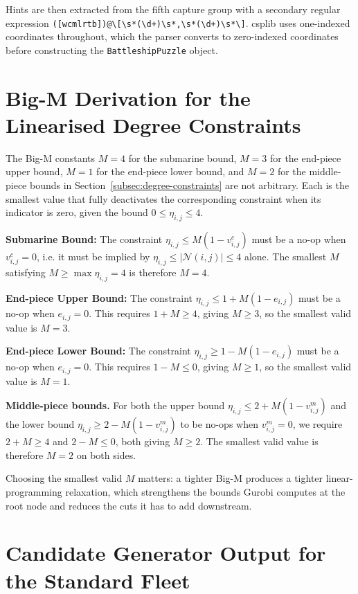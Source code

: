 Hints are then extracted from the fifth capture group with a secondary regular expression \verb|([wcmlrtb])@\[\s*(\d+)\s*,\s*(\d+)\s*\]|. \gls{csplib} uses one-indexed coordinates throughout, which the parser converts to zero-indexed coordinates before constructing the \verb|BattleshipPuzzle| object.

\section{Big-M Derivation for the Linearised Degree Constraints}\label{app:bigm}

The Big-M constants $M = 4$ for the submarine bound, $M = 3$ for the end-piece upper bound, $M = 1$ for the end-piece lower bound, and $M = 2$ for the middle-piece bounds in Section~\ref{subsec:degree-constraints} are not arbitrary. Each is the smallest value that fully deactivates the corresponding constraint when its indicator is zero, given the bound $0 \leq \eta_{i,j} \leq 4$.

\textbf{Submarine Bound:}
The constraint $\eta_{i,j} \leq M (1 - v_{i,j}^c)$ must be a no-op when $v_{i,j}^c = 0$, i.e. it must be implied by $\eta_{i,j} \leq |\mathcal{N}(i, j)| \leq 4$ alone. The smallest $M$ satisfying $M \geq \max \eta_{i,j} = 4$ is therefore $M = 4$.

\textbf{End-piece Upper Bound:}
The constraint $\eta_{i,j} \leq 1 + M(1 - e_{i,j})$ must be a no-op when $e_{i,j} = 0$. This requires $1 + M \geq 4$, giving $M \geq 3$, so the smallest valid value is $M = 3$.

\textbf{End-piece Lower Bound:}
The constraint $\eta_{i,j} \geq 1 - M(1 - e_{i,j})$ must be a no-op when $e_{i,j} = 0$. This requires $1 - M \leq 0$, giving $M \geq 1$, so the smallest valid value is $M = 1$.

\textbf{Middle-piece bounds.}
For both the upper bound $\eta_{i,j} \leq 2 + M(1 - v_{i,j}^m)$ and the lower bound $\eta_{i,j} \geq 2 - M(1 - v_{i,j}^m)$ to be no-ops when $v_{i,j}^m = 0$, we require $2 + M \geq 4$ and $2 - M \leq 0$, both giving $M \geq 2$. The smallest valid value is therefore $M = 2$ on both sides.

Choosing the smallest valid $M$ matters: a tighter Big-M produces a tighter linear-programming relaxation, which strengthens the bounds Gurobi computes at the root node and reduces the cuts it has to add downstream.

\section{Candidate Generator Output for the Standard Fleet}\label{app:candidate-counts}

